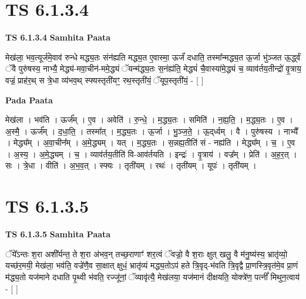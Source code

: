 \documentclass[17pt]{extarticle}
\begin{document}

\section{ TS 6.1.3.4 }

\textbf{TS 6.1.3.4 } \newline
\textbf{Samhita Paata} \newline

मेख॑ला॒ भव॒त्यूर्ज॑मे॒वाव॑ रुन्धे मद्ध्य॒तः संन॑ह्यति मद्ध्य॒त ए॒वास्मा॒ ऊर्जं॑ दधाति॒ तस्मा᳚न्मद्ध्य॒त ऊ॒र्जा भु॑ञ्जत ऊ॒र्द्ध्वं ॅवै पुरु॑षस्य॒ नाभ्यै॒ मेद्ध्य॑-मवा॒चीन॑-ममे॒द्ध्यं ॅयन्म॑द्ध्य॒तः स॒नंह्य॑ति॒ मेद्ध्यं॑ चै॒वास्या॑मे॒द्ध्यं च॒ व्याव॑र्तय॒तीन्द्रो॑ वृ॒त्राय॒ वज्रं॒ प्राह॑र॒थ् स त्रे॒धा व्य॑भव॒थ् स्फ्यस्तृती॑यꣳ॒॒ रथ॒स्तृती॑यं॒ ॅयूप॒स्तृती॑यं॒ - [  ] \newline

\textbf{Pada Paata} \newline

मेख॑ला । भव॑ति । ऊर्ज᳚म् । ए॒व । अवेति॑ । रु॒न्धे॒ । म॒द्ध्य॒तः । समिति॑ । न॒ह्य॒ति॒ । म॒द्ध्य॒तः । ए॒व । अ॒स्मै॒ । ऊर्ज᳚म् । द॒धा॒ति॒ । तस्मा᳚त् । म॒द्ध्य॒तः । ऊ॒र्जा । भु॒ञ्ज॒ते॒ । ऊ॒द्‌र्ध्वम् । वै । पुरु॑षस्य । नाभ्यै᳚ । मेद्ध्य᳚म् । अ॒वा॒चीन᳚म् । अ॒मे॒द्ध्यम् । यत् । म॒द्ध्य॒तः । स॒न्नह्य॒तीति॑ सं - नह्य॑ति । मेद्ध्य᳚म् । च॒ । ए॒व । अ॒स्य॒ । अ॒मे॒द्ध्यम् । च॒ । व्याव॑र्तय॒तीति॑ वि-आव॑र्तयति । इन्द्रः॑ । वृ॒त्राय॑ । वज्र᳚म् । प्रेति॑ । अ॒ह॒र॒त् । सः । त्रे॒धा । वीति॑ । अ॒भ॒व॒त् । स्फ्यः । तृती॑यम् । रथः॑ । तृती॑यम् । यूपः॑ । तृती॑यम् ।  \newline





\section{ TS 6.1.3.5 }

\textbf{TS 6.1.3.5 } \newline
\textbf{Samhita Paata} \newline

ॅये᳚ऽन्तः श॒रा अशी᳚र्यन्त॒ ते श॒रा अ॑भव॒न् तच्छ॒राणाꣳ॑ शर॒त्वं ॅवज्रो॒ वै श॒राः क्षुत् खलु॒ वै म॑नु॒ष्य॑स्य॒ भ्रातृ॑व्यो॒ यच्छ॑र॒मयी॒ मेख॑ला॒ भव॑ति॒ वज्रे॑णै॒व सा॒क्षात् क्षुधं॒ भ्रातृ॑व्यं मद्ध्य॒तोऽप॑ हते त्रि॒वृद्-भ॑वति त्रि॒वृद्वै प्रा॒णस्त्रि॒वृत॑मे॒व प्रा॒णं म॑द्ध्य॒तो यज॑माने दधाति पृ॒थ्वी भ॑वति॒ रज्जू॑नां॒ ॅव्यावृ॑त्यै॒ मेख॑लया॒ यज॑मानं दीक्षयति॒ योक्त्रे॑ण॒ पत्नीं᳚ मिथुन॒त्वाय॑ - [  ] \newline
\end{document}
